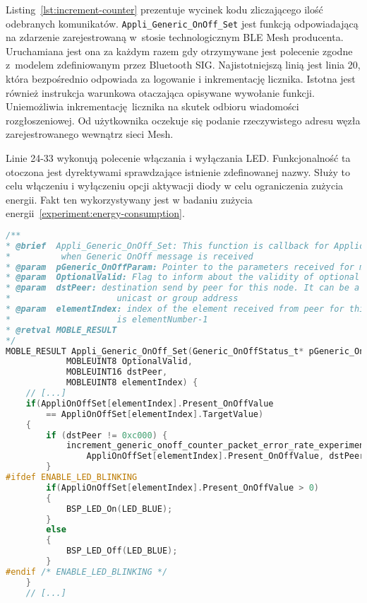 Listing~\ref{lst:increment-counter} prezentuje wycinek kodu zliczającego ilość odebranych komunikatów. 
\texttt{Appli\_Generic\_OnOff\_Set} jest funkcją odpowiadającą na zdarzenie zarejestrowaną w~stosie technologicznym
BLE Mesh producenta. Uruchamiana jest ona za każdym razem gdy otrzymywane jest polecenie zgodne
z~modelem zdefiniowanym przez Bluetooth SIG. Najistotniejszą linią jest linia 20, która bezpośrednio
odpowiada za logowanie i inkrementację licznika. Istotna jest również instrukcja warunkowa
otaczająca opisywane wywołanie funkcji. Uniemożliwia inkrementację licznika na skutek odbioru
wiadomości rozgłoszeniowej. Od użytkownika oczekuje się podanie rzeczywistego adresu węzła
zarejestrowanego wewnątrz sieci Mesh.

Linie 24-33 wykonują polecenie włączania i wyłączania \gls{LED}. Funkcjonalność ta otoczona jest
dyrektywami sprawdzające istnienie zdefinowanej nazwy. Służy to celu włączeniu i wyłączeniu
opcji aktywacji diody w celu ograniczenia zużycia energii. Fakt ten wykorzystywany jest
w badaniu zużycia energii~\ref{experiment:energy-consumption}.


\begin{lstlisting}[language=C,
    caption={Inkrementacja licznika realizowana jest poprzez dostosowanie funkcji odpowiadającej na zdarzenie},
    label={lst:increment-counter}]
/**
* @brief  Appli_Generic_OnOff_Set: This function is callback for Application
*          when Generic OnOff message is received
* @param  pGeneric_OnOffParam: Pointer to the parameters received for message
* @param  OptionalValid: Flag to inform about the validity of optional parameters 
* @param  dstPeer: destination send by peer for this node. It can be a
*                     unicast or group address 
* @param  elementIndex: index of the element received from peer for this node which
*                     is elementNumber-1
* @retval MOBLE_RESULT
*/ 
MOBLE_RESULT Appli_Generic_OnOff_Set(Generic_OnOffStatus_t* pGeneric_OnOffParam, 
			MOBLEUINT8 OptionalValid,
			MOBLEUINT16 dstPeer,
			MOBLEUINT8 elementIndex) {
	// [...]
	if(AppliOnOffSet[elementIndex].Present_OnOffValue 
		== AppliOnOffSet[elementIndex].TargetValue)
	{
		if (dstPeer != 0xc000) {
			increment_generic_onoff_counter_packet_error_rate_experiment(
				AppliOnOffSet[elementIndex].Present_OnOffValue, dstPeer);
		}
#ifdef ENABLE_LED_BLINKING
		if(AppliOnOffSet[elementIndex].Present_OnOffValue > 0)
		{
			BSP_LED_On(LED_BLUE);
		}
		else
		{
			BSP_LED_Off(LED_BLUE);
		}
#endif /* ENABLE_LED_BLINKING */
	}
	// [...]
\end{lstlisting}

